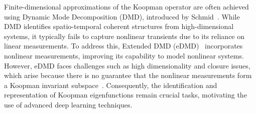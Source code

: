 \documentclass[conference]{IEEEtran}
\begin{document}
Finite-dimensional approximations of the Koopman operator are often achieved using Dynamic Mode Decomposition (DMD), introduced by Schmid~\cite{schmid2010dynamic}. While DMD identifies spatio-temporal coherent structures from high-dimensional systems, it typically fails to capture nonlinear transients due to its reliance on linear measurements. To address this, Extended DMD (eDMD)~\cite{williams2015data} incorporates nonlinear measurements, improving its capability to model nonlinear systems. However, eDMD faces challenges such as high dimensionality and closure issues, which arise because there is no guarantee that the nonlinear measurements form a Koopman invariant subspace~\cite{Lusch2018}. Consequently, the identification and representation of Koopman eigenfunctions remain crucial tasks, motivating the use of advanced deep learning techniques.
\end{document}
